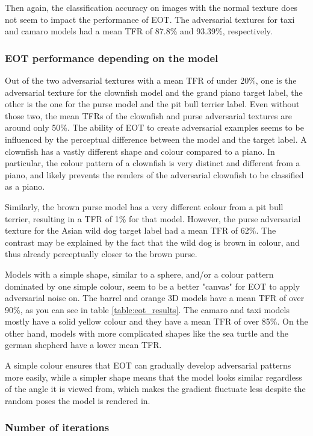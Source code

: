 Then again, the classification accuracy on images with the normal texture does not seem to impact the performance of EOT. The adversarial textures for taxi and camaro models had a mean TFR of 87.8\% and 93.39\%, respectively.

\subsubsection{EOT performance depending on the model}

Out of the two adversarial textures with a mean TFR of under 20\%, one is the adversarial texture for the clownfish model and the grand piano target label, the other is the one for the purse model and the pit bull terrier label. Even without those two, the mean TFRs of the clownfish and purse adversarial textures are around only 50\%. The ability of EOT to create adversarial examples seems to be influenced by the perceptual difference between the model and the target label. A clownfish has a vastly different shape and colour compared to a piano. In particular, the colour pattern of a clownfish is very distinct and different from a piano, and likely prevents the renders of the adversarial clownfish to be classified as a piano.

Similarly, the brown purse model has a very different colour from a pit bull terrier, resulting in a TFR of 1\% for that model. However, the purse adversarial texture for the Asian wild dog target label had a mean TFR of 62\%. The contrast may be explained by the fact that the wild dog is brown in colour, and thus already perceptually closer to the brown purse.

Models with a simple shape, similar to a sphere, and/or a colour pattern dominated by one simple colour, seem to be a better "canvas" for EOT to apply adversarial noise on. The barrel and orange 3D models have a mean TFR of over 90\%, as you can see in table \ref{table:eot_results}. The camaro and taxi models mostly have a solid yellow colour and they have a mean TFR of over 85\%. On the other hand, models with more complicated shapes like the sea turtle and the german shepherd have a lower mean TFR. 

A simple colour ensures that EOT can gradually develop adversarial patterns more easily, while a simpler shape means that the model looks similar regardless of the angle it is viewed from, which makes the gradient fluctuate less despite the random poses the model is rendered in.

\subsubsection{Number of iterations}

